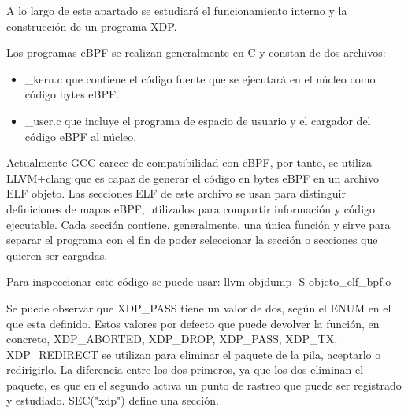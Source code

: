 A lo largo de este apartado se estudiará el funcionamiento interno y la construcción de un programa XDP.

Los programas eBPF se realizan generalmente en C y constan de dos archivos:
\begin{itemize}
        \item \_kern.c que contiene el código fuente que se ejecutará en el núcleo como código bytes eBPF.
        \item \_user.c que incluye el programa de espacio de usuario y el cargador del código eBPF al núcleo.
\end{itemize}
Actualmente GCC carece de compatibilidad con eBPF, por tanto, se utiliza LLVM+clang que es capaz de generar el código en bytes eBPF en un archivo ELF objeto.
Las secciones ELF de este archivo se usan para distinguir definiciones de mapas eBPF, utilizados para compartir información y código ejecutable. Cada sección contiene, generalmente, una única función y sirve para separar el programa con el fin de poder seleccionar la sección o secciones que quieren ser cargadas.

Para inspeccionar este código se puede usar: llvm-objdump -S objeto\_elf\_bpf.o


Se puede observar que XDP\_PASS tiene un valor de dos, según el ENUM en el que esta definido. Estos valores por defecto que puede devolver la función, en concreto, XDP\_ABORTED, XDP\_DROP, XDP\_PASS, XDP\_TX, XDP\_REDIRECT se utilizan para eliminar el paquete de la pila, aceptarlo o redirigirlo. La diferencia entre los dos primeros, ya que los dos eliminan el paquete, es que en el segundo activa un punto de rastreo que puede ser registrado y estudiado. SEC("xdp") define una sección.

